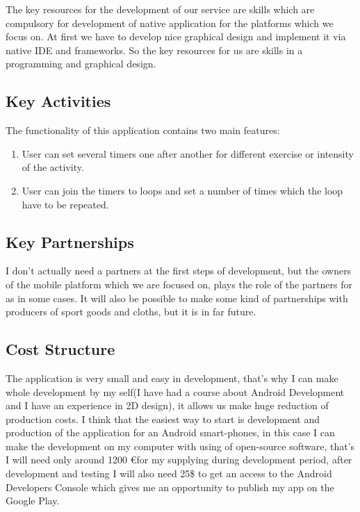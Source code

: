 \documentclass[english]{article}
\begin{document}
The key resources for the development of our service are skills which are compulsory for development of native application for the platforms which we focus on. At first we have to develop nice graphical design and implement it via native IDE and frameworks. So the key resources for us are skills in a programming and graphical design. 

\subsection{Key Activities}

The functionality of this application contains two main features:
\begin{enumerate}
	\item User can set several timers one after another for different exercise or intensity of the activity.
	\item User can join the timers to loops and set a number of times which the loop have to be repeated.
\end{enumerate}

\subsection{Key Partnerships}

I don't actually need a partners at the first steps of development, but the owners of the mobile platform which we are focused on, plays the role of the partners for as in some cases. It will also be possible to make some kind of partnerships with producers of sport goods and cloths, but it is in far future. 

\subsection{Cost Structure}

The application is very small and easy in development, that's why I can make whole development by my self(I have had a course about Android Development and I have an experience in 2D design), it allows us make huge reduction of production costs. I think that the easiest way to start is development and production of the application for an Android smart-phones, in this case I can make the development on my computer with using of open-source software, that's I will need only around 1200 \euro for my supplying during development period, after development and testing I will also need 25\$ to get an access to the Android Developers Console which gives me an opportunity to publish my app on the Google Play.
\end{document}
